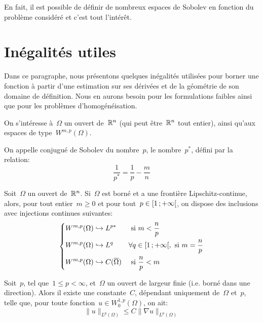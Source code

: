 \medskip
En fait, il est possible de définir de nombreux espaces de Sobolev en fonction du problème considéré et c'est tout l'intérêt.

\medskip
\section{Inégalités utiles}
Dans ce paragraphe, nous présentons quelques inégalités utilisées pour borner une fonction à partir d'une estimation sur ses dérivées et de la géométrie de son domaine de définition. Nous en aurons besoin pour les formulations faibles ainsi que pour les problèmes d'homogénéisation.
\begin{definition}
On s'intéresse à~$\Omega$ un ouvert de~$\mathbb R^n$ (qui peut être~$\mathbb R^n$ tout entier), ainsi qu'aux espaces de type~$W^{m,p}(\Omega)$.

On appelle conjugué de Sobolev du nombre~$p$, le nombre~$p^*$, défini par la relation:
\begin{equation}
  \frac{1}{p^*} = \frac{1}{p} - \frac{m}{n}
\end{equation}
\end{definition}
\begin{theoreme}\label{Th-Inj-Sobo}
Soit~$\Omega$ un ouvert de~$\mathbb R^n$. Si~$\Omega$ est borné et a une frontière Lipschitz-continue, alors, pour tout entier~$m\ge 0$ et pour tout~$p\in\mathopen{[}1\,;+\infty\mathclose{[}$, on dispose des inclusions avec injections continues suivantes:
\begin{equation}
\left\{\begin{aligned}
&W^{m,p}(\Omega) \hookrightarrow L^{p*} && \text{ si } m<\frac{n}p\\
&W^{m,p}(\Omega) \hookrightarrow L^q && \forall q\in\mathopen{[}1\,;+\infty\mathclose{[}, \text{ si } m=\frac{n}p\\
&W^{m,p}(\Omega) \hookrightarrow C(\overline{\Omega}) && \text{ si } \frac{n}p<m
\end{aligned}\right.
\end{equation}
\end{theoreme}


\medskip
\begin{theoreme}
Soit~$p$, tel que~$1 \le p <\infty$, et~$\Omega$ un ouvert de largeur finie
(i.e. borné dans une direction).
Alors il existe une constante~$C$, dépendant uniquement de~$\Omega$ et~$p$, telle que, pour toute fonction~$u\in W_0^{1,p}(\Omega)$, on ait:
\begin{equation}
\|u\|_{L^p(\Omega)} \le C \|\nabla u\|_{L^p(\Omega)}
\end{equation}
\end{theoreme}

